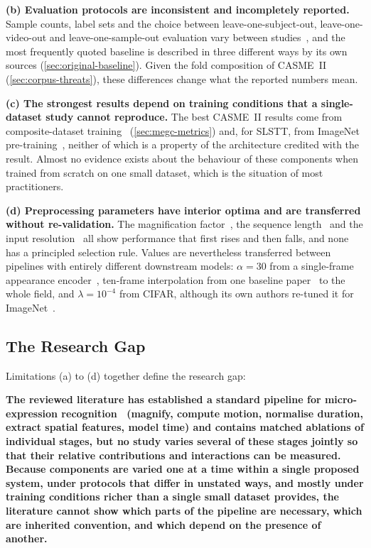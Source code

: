 \textbf{(b) Evaluation protocols are inconsistent and incompletely reported.} Sample counts, label sets and the choice between leave-one-subject-out, leave-one-video-out and leave-one-sample-out evaluation vary between studies~\cite{yan2014,liong2016,qu2016,liX2018}, and the most frequently quoted baseline is described in three different ways by its own sources (\autoref{sec:original-baseline}). Given the fold composition of CASME~II (\autoref{sec:corpus-threats}), these differences change what the reported numbers mean.

\textbf{(c) The strongest results depend on training conditions that a single-dataset study cannot reproduce.} The best CASME~II results come from composite-dataset training~\cite{see2019} (\autoref{sec:megc-metrics}) and, for SLSTT, from ImageNet pre-training~\cite{zhang2022,dosovitskiy2021}, neither of which is a property of the architecture credited with the result. Almost no evidence exists about the behaviour of these components when trained from scratch on one small dataset, which is the situation of most practitioners.

\textbf{(d) Preprocessing parameters have interior optima and are transferred without re-validation.} The magnification factor~\cite{liX2018}, the sequence length~\cite{liX2018,ben2021} and the input resolution~\cite{xia2020b} all show performance that first rises and then falls, and none has a principled selection rule. Values are nevertheless transferred between pipelines with entirely different downstream models: $\alpha = 30$ from a single-frame appearance encoder~\cite{liY2018}, ten-frame interpolation from one baseline paper~\cite{liX2013} to the whole field, and $\lambda = 10^{-4}$ from CIFAR, although its own authors re-tuned it for ImageNet~\cite{yang2021}.

\subsection{The Research Gap}
\label{sec:research-gap}

Limitations (a) to (d) together define the research gap:

\textbf{The reviewed literature has established a standard pipeline for micro-expression recognition~\cite{ben2021,li2022survey,xie2022} (magnify, compute motion, normalise duration, extract spatial features, model time) and contains matched ablations of individual stages, but no study varies several of these stages jointly so that their relative contributions and interactions can be measured. Because components are varied one at a time within a single proposed system, under protocols that differ in unstated ways, and mostly under training conditions richer than a single small dataset provides, the literature cannot show which parts of the pipeline are necessary, which are inherited convention, and which depend on the presence of another.}

